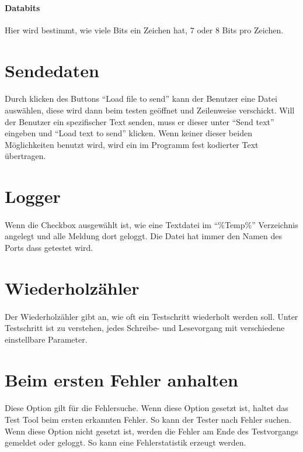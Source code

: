 \paragraph{Databits} Hier wird bestimmt, wie viele Bits ein Zeichen hat, 7 oder 8 Bits pro Zeichen.

\section{Sendedaten}
\paragraph{}
Durch klicken des Buttons "`Load file to send"' kann der Benutzer eine Datei auswählen, diese wird dann beim testen geöffnet und Zeilenweise verschickt. Will der Benutzer ein spezifischer Text senden, muss er dieser unter "`Send text"' eingeben und "`Load text to send"' klicken. Wenn keiner dieser beiden Möglichkeiten benutzt wird, wird ein im Programm fest kodierter Text übertragen.

\section{Logger}
\paragraph{}
Wenn die Checkbox ausgewählt ist, wie eine Textdatei im "`\%Temp\%"' Verzeichnis angelegt und alle Meldung dort geloggt. Die Datei hat immer den Namen des Ports dass getestet wird.

\section{Wiederholzähler}
\paragraph{}
Der Wiederholzähler gibt an, wie oft ein Testschritt wiederholt werden soll. Unter Testschritt ist zu verstehen, jedes Schreibe- und Lesevorgang mit verschiedene einstellbare Parameter.

\section{Beim ersten Fehler anhalten}
\paragraph{}
Diese Option gilt für die Fehlersuche. Wenn diese Option gesetzt ist, haltet das Test Tool beim ersten erkannten Fehler. So kann der Tester nach Fehler suchen. Wenn diese Option nicht gesetzt ist, werden die Fehler am Ende des Testvorgangs gemeldet oder geloggt. So kann eine Fehlerstatistik erzeugt werden.


